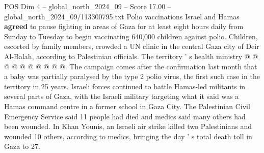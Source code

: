 \begin{textsample}{POS Dim 4 – global\_north\_2024\_09 – Score 17.00 – global\_north\_2024\_09/113300795.txt}
Polio vaccinations Israel and Hamas \textbf{agreed} to pause fighting in areas of Gaza for at least eight hours daily from Sunday to Tuesday to begin vaccinating 640,000 children against polio.
Children, escorted by family members, crowded a UN clinic in the central Gaza city of Deir Al-Balah, according to Palestinian officials.
The territory ' s health ministry @ @ @ @ @ @ @ @ @ @.
The campaign comes after the confirmation last month that a baby was partially paralysed by the type 2 polio virus, the first such case in the territory in 25 years.
Israeli forces continued to battle Hamas-led militants in several parts of Gaza, with the Israeli military targeting what it said was a Hamas command centre in a former school in Gaza City.
The Palestinian Civil Emergency Service said 11 people had died and medics said many others had been wounded.
In Khan Younis, an Israeli air strike killed two Palestinians and wounded 10 others, according to medics, bringing the day ' s total death toll in Gaza to 27.

\end{textsample}
